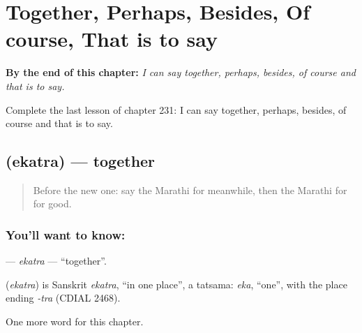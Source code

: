 
\chapter{Together, Perhaps, Besides, Of course, That is to say}
\label{ch:mr-together-perhaps-besides-of-course-that-is-to-say}

\begin{chapteropening}
\textbf{By the end of this chapter:} \emph{I can say together, perhaps, besides, of course and that is to say.}

Complete the last lesson of chapter 231: I can say together, perhaps, besides, of course and that is to say.
\end{chapteropening}

\section[\texorpdfstring{\mr{एकत्र} (ekatra)}{एकत्र (ekatra)}]{ (ekatra) — together}

\label{lesson:MR-C231-ekatra}



\begin{quote}
Before the new one: say the Marathi for meanwhile, then the Marathi for for good.
\end{quote}

\subsection*{You'll want to know: }
\textbf{} — \emph{ekatra} — \textquotedblleft{}together\textquotedblright{}.

\begin{cousinweb}
\textbf{} (\emph{ekatra}) is Sanskrit \emph{ekatra}, \textquotedblleft{}in one place\textquotedblright{}, a tatsama: \emph{eka}, \textquotedblleft{}one\textquotedblright{}, with the place ending \emph{-tra} (CDIAL 2468).
\end{cousinweb}

\begin{grammarlens}[title={What you've built}]
One more word for this chapter.
\end{grammarlens}

